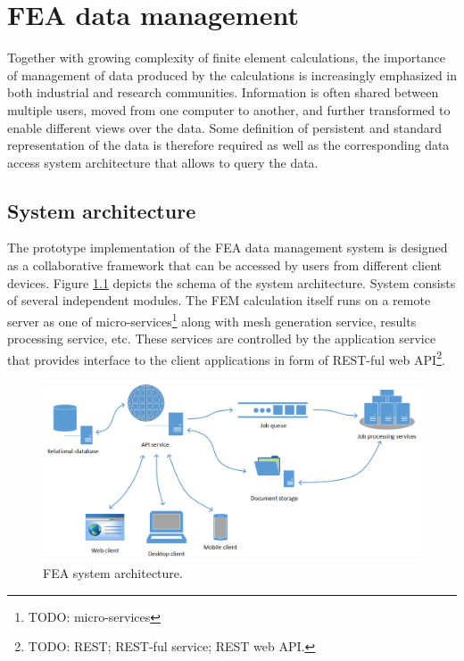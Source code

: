 \chapter{FEA data management}
\label{chapter:data-management}

Together with growing complexity of finite element calculations, the importance of management of data produced by the calculations is increasingly emphasized in both industrial and research communities. Information is often shared between multiple users, moved from one computer to another, and further transformed to enable different views over the data. Some definition of persistent and standard representation of the data is therefore required as well as the corresponding data access system architecture that allows to query the data.

\section{System architecture}
\label{sec:system-architecture}

The prototype implementation of the FEA data management system is designed as a collaborative framework that can be accessed by users from different client devices. Figure \ref{fig:FEA-architecture} depicts the schema of the system architecture. System consists of several independent modules. The FEM calculation itself runs on a remote server as one of micro-services\footnote{TODO: micro-services} along with mesh generation service, results processing service, etc. These services are controlled by the application service that provides interface to the client applications in form of REST-ful web API\footnote{TODO: REST; REST-ful service; REST web API.}.

\begin{figure}[H]
    \centering
    \includegraphics[width=\textwidth]{figures/chapter-data-management/FEA-architecture}
    \decoRule
    \caption{FEA system architecture.}
    \label{fig:FEA-architecture}
\end{figure}

